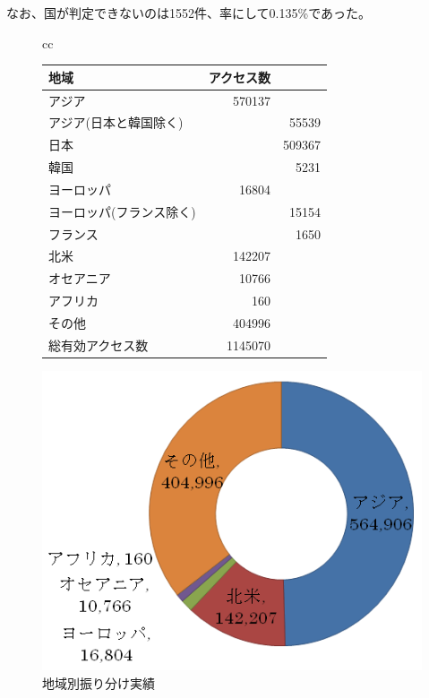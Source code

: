 \documentclass[mingoth,a4paper]{jsarticle}
\begin{document}
なお、国が判定できないのは1552件、率にして0.135\%であった。

\begin{figure}[!h]
 \begin{tabular}{cc}
  \begin{minipage}{0.5\hsize}
   \begin{center}
    \caption{CDN振り分け先実績}
    \begin{tabular}{|l|r|l|}
     \hline
     地域 & \multicolumn{1}{l|}{アクセス数} &  \\ \hline
     アジア & 570137 &  \\ \hline
     アジア(日本と韓国除く) & \multicolumn{1}{l|}{} & \multicolumn{1}{r|}{55539} \\ \hline
     日本 & \multicolumn{1}{l|}{} & \multicolumn{1}{r|}{509367} \\ \hline
     韓国 & \multicolumn{1}{l|}{} & \multicolumn{1}{r|}{5231} \\ \hline
     ヨーロッパ & 16804 &  \\ \hline
     ヨーロッパ(フランス除く) & \multicolumn{1}{l|}{} & \multicolumn{1}{r|}{15154} \\ \hline
     フランス & \multicolumn{1}{l|}{} & \multicolumn{1}{r|}{1650} \\ \hline
     北米 & 142207 &  \\ \hline
     オセアニア & 10766 &  \\ \hline
     アフリカ & 160 &  \\ \hline
     その他 & 404996 &  \\ \hline
     総有効アクセス数 & 1145070 &  \\ \hline
    \end{tabular}
    \label{dnsquery}
   \end{center}
  \end{minipage}
  \begin{minipage}{0.5\hsize}
   \begin{center}
    \includegraphics[width=0.9\hsize]{image200810/cdn-area-world.png}
    \caption{地域別振り分け実績}
    \label{fig:cdn-area-world}
   \end{center}
  \end{minipage}
 \end{tabular}
\end{figure}
\end{document}
